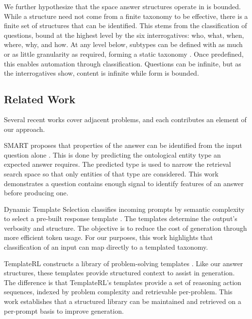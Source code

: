 \documentclass{article}
\begin{document}
We further hypothesize that the space answer structures operate in is bounded. While a structure need not come from a finite taxonomy to be effective, there is a finite set of structures that can be identified. This stems from the classification of questions, bound at the highest level by the six interrogatives: who, what, when, where, why, and how. At any level below, subtypes can be defined with as much or as little granularity as required, forming a static taxonomy \cite{liroth2002questions, nonfactoid_taxonomy2022}. Once predefined, this enables automation through classification. Questions can be infinite, but as the interrogatives show, content is infinite while form is bounded.

\subsection{Related Work}

Several recent works cover adjacent problems, and each contributes an element of our approach.

SMART proposes that properties of the answer can be identified from the input question alone \cite{setty2023smart, smart2021}. This is done by predicting the ontological entity type an expected answer requires. The predicted type is used to narrow the retrieval search space so that only entities of that type are considered. This work demonstrates a question contains enough signal to identify features of an answer before producing one.

Dynamic Template Selection classifies incoming prompts by semantic complexity to select a pre-built response template \cite{yadavalli2025dts}. The templates determine the output's verbosity and structure. The objective is to reduce the cost of generation through more efficient token usage. For our purposes, this work highlights that classification of an input can map directly to a templated taxonomy.

TemplateRL constructs a library of problem-solving templates \cite{wu2025templaterl}. Like our answer structures, these templates provide structured context to assist in generation. The difference is that TemplateRL's templates provide a set of reasoning action sequences, indexed by problem complexity and retrievable per-problem. This work establishes that a structured library can be maintained and retrieved on a per-prompt basis to improve generation.
\end{document}
